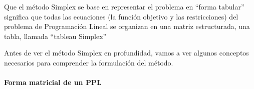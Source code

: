 \begin{tcolorbox}[interesting_data, title=Forma tabular]
  Que el método Simplex se base en representar el problema en ``forma tabular'' significa que todas las ecuaciones (la función objetivo y las restricciones) del problema de Programación Lineal se organizan en una matriz estructurada, una tabla, llamada ``tableau Simplex''
\end{tcolorbox}

Antes de ver el método Simplex en profundidad, vamos a ver algunos conceptos necesarios para comprender la formulación del método.

\vspace{3mm}

\paragraph{Forma matricial de un PPL}

